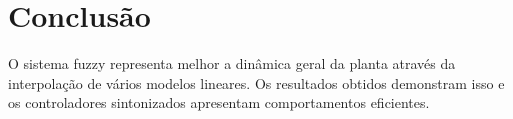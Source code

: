 %

\chapter{Conclusão} \label{capConclusao}

O sistema fuzzy representa melhor a dinâmica geral da planta através da interpolação de vários modelos lineares. Os resultados obtidos demonstram isso e os controladores sintonizados apresentam comportamentos eficientes.

%


